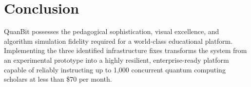 \documentclass[11pt, a4paper]{article}
\begin{document}
\section{Conclusion}
QuanBit possesses the pedagogical sophistication, visual excellence, and algorithm simulation fidelity required for a world-class educational platform. Implementing the three identified infrastructure fixes transforms the system from an experimental prototype into a highly resilient, enterprise-ready platform capable of reliably instructing up to 1,000 concurrent quantum computing scholars at less than \$70 per month.
\end{document}
